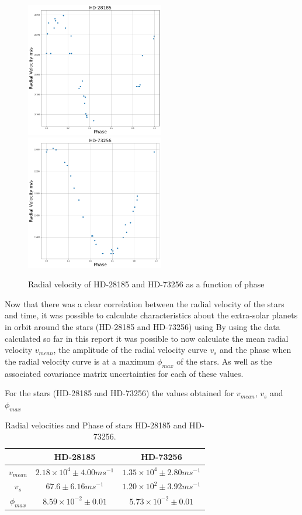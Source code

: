 \documentclass[]{article}
\begin{document}
\begin{figure}[h]
\includegraphics[width=6cm]{images/HD-28185_phase.png}
\includegraphics[width=6cm]{images/HD-73256_phase.png}
\caption{Radial velocity of HD-28185 and HD-73256 as a function of phase}
\label{fig:HD-_phase}
\end{figure}

Now that there was a clear correlation between the radial velocity of the stars and
time, it was possible to calculate characteristics about the extra-solar planets in 
orbit around the stars (HD-28185 and HD-73256) using %
By using the data calculated so far in this report it was possible to now calculate 
the mean radial velocity $v_{mean} $, the amplitude of the radial velocity curve
 $v_{s}$ and the 
phase when the radial velocity curve is at a maximum $\phi_{max}$ of the stars.
As well as the associated covariance matrix uncertainties for each of these values.
\par
For the stars (HD-28185 and HD-73256) the values obtained for $v_{mean}$, $v_{s}$ 
and $\phi_{max}$ 


\begin{table}[h!]
    \begin{center}
      \caption{Radial velocities and Phase of stars HD-28185 and HD-73256.}
      \label{tab:table1}
      \begin{tabular}{c|c|c}
         & {HD-28185} & {HD-73256} \\
        \hline
        $v_{mean} $ & $ 2.18\times10^4 \pm4.00ms^{-1}$ & $1.35\times10^4\pm2.80ms^{-1}$ \\
        \hline
        $v_{s}$ & $67.6\pm6.16ms^{-1} $ & $1.20\times10^2\pm3.92ms^{-1}$\\
        \hline
        $\phi_{max}$ & $8.59\times10^{-2} \pm 0.01$ & $5.73\times10^{-2}\pm0.01$  \\
        
      \end{tabular}
    \end{center}
  \end{table}
\end{document}
